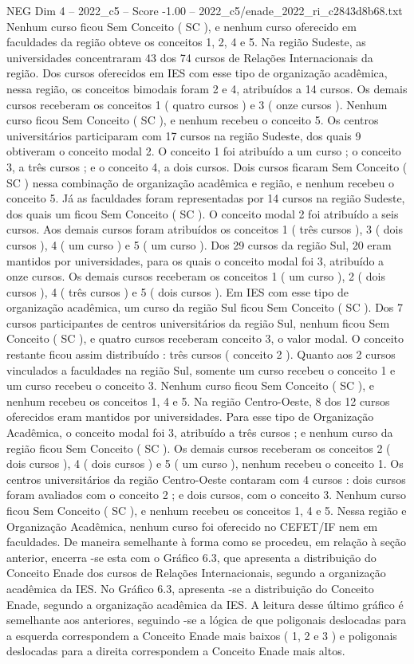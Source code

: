 \begin{textsample}{NEG Dim 4 – 2022\_c5 – Score -1.00 – 2022\_c5/enade\_2022\_ri\_c2843d8b68.txt}
Nenhum curso ficou Sem Conceito ( SC ), e nenhum curso oferecido em faculdades da região obteve os conceitos 1, 2, 4 e 5.
Na região Sudeste, as universidades concentraram 43 dos 74 cursos de Relações Internacionais da região.
Dos cursos oferecidos em IES com esse tipo de organização acadêmica, nessa região, os conceitos bimodais foram 2 e 4, atribuídos a 14 cursos.
Os demais cursos receberam os conceitos 1 ( quatro cursos ) e 3 ( onze cursos ).
Nenhum curso ficou Sem Conceito ( SC ), e nenhum recebeu o conceito 5.
Os centros universitários participaram com 17 cursos na região Sudeste, dos quais 9 obtiveram o conceito modal 2.
O conceito 1 foi atribuído a um curso ; o conceito 3, a três cursos ; e o conceito 4, a dois cursos.
Dois cursos ficaram Sem Conceito ( SC ) nessa combinação de organização acadêmica e região, e nenhum recebeu o conceito 5.
Já as faculdades foram representadas por 14 cursos na região Sudeste, dos quais um ficou Sem Conceito ( SC ).
O conceito modal 2 foi atribuído a seis cursos.
Aos demais cursos foram atribuídos os conceitos 1 ( três cursos ), 3 ( dois cursos ), 4 ( um curso ) e 5 ( um curso ).
Dos 29 cursos da região Sul, 20 eram mantidos por universidades, para os quais o conceito modal foi 3, atribuído a onze cursos.
Os demais cursos receberam os conceitos 1 ( um curso ), 2 ( dois cursos ), 4 ( três cursos ) e 5 ( dois cursos ).
Em IES com esse tipo de organização acadêmica, um curso da região Sul ficou Sem Conceito ( SC ).
Dos 7 cursos participantes de centros universitários da região Sul, nenhum ficou Sem Conceito ( SC ), e quatro cursos receberam conceito 3, o valor modal.
O conceito restante ficou assim distribuído : três cursos ( conceito 2 ).
Quanto aos 2 cursos vinculados a faculdades na região Sul, somente um curso recebeu o conceito 1 e um curso recebeu o conceito 3.
Nenhum curso ficou Sem Conceito ( SC ), e nenhum recebeu os conceitos 1, 4 e 5.
Na região Centro-Oeste, 8 dos 12 cursos oferecidos eram mantidos por universidades.
Para esse tipo de Organização Acadêmica, o conceito modal foi 3, atribuído a três cursos ; e nenhum curso da região ficou Sem Conceito ( SC ).
Os demais cursos receberam os conceitos 2 ( dois cursos ), 4 ( dois cursos ) e 5 ( um curso ), nenhum recebeu o conceito 1.
Os centros universitários da região Centro-Oeste contaram com 4 cursos : dois cursos foram avaliados com o conceito 2 ; e dois cursos, com o conceito 3.
Nenhum curso ficou Sem Conceito ( SC ), e nenhum recebeu os conceitos 1, 4 e 5.
Nessa região e Organização Acadêmica, nenhum curso foi oferecido no CEFET/IF nem em faculdades.
De maneira semelhante à forma como se procedeu, em relação à seção anterior, encerra -se esta com o Gráfico 6.3, que apresenta a distribuição do Conceito Enade dos cursos de Relações Internacionais, segundo a organização acadêmica da IES.
No Gráfico 6.3, apresenta -se a distribuição do Conceito Enade, segundo a organização acadêmica da IES.
A leitura desse último gráfico é semelhante aos anteriores, seguindo -se a lógica de que poligonais deslocadas para a esquerda correspondem a Conceito Enade mais baixos ( 1, 2 e 3 ) e poligonais deslocadas para a direita correspondem a Conceito Enade mais altos.

\end{textsample}

